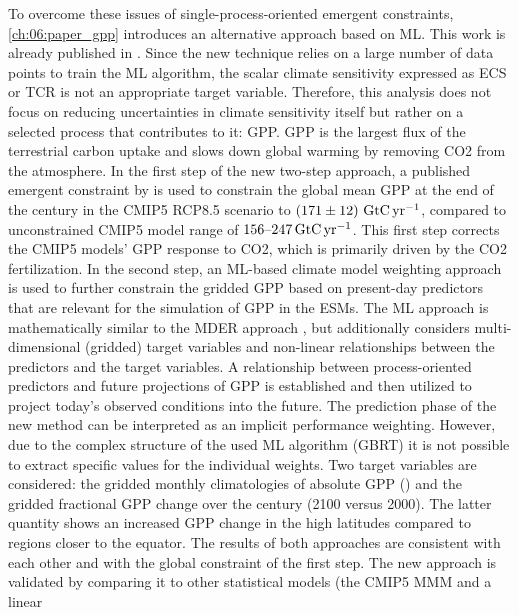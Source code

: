 To overcome these issues of single-process-oriented emergent constraints,
\cref{ch:06:paper_gpp} introduces an alternative approach based on \ac{ML}.
This work is already published in \textcite{Schlund2020}. Since the new
technique relies on a large number of data points to train the \ac{ML}
algorithm, the scalar climate sensitivity expressed as \ac{ECS} or \ac{TCR} is
not an appropriate target variable. Therefore, this analysis does not focus on
reducing uncertainties in climate sensitivity itself but rather on a selected
process that contributes to it: \ac{GPP}. \Ac{GPP} is the largest flux of the
terrestrial carbon uptake and slows down global warming by removing \ac{CO2}
from the atmosphere. In the first step of the new two-step approach, a
published emergent constraint by \textcite{Wenzel2016} is used to constrain the
global mean \ac{GPP} at the end of the  century in the \acs{CMIP}5
\acs{RCP}8.5 scenario to $\pmrangeunit{171}{12}{\GtCyr{}}$, compared to
unconstrained \acs{CMIP}5 model range of $\rangeunit{156}{247}{\GtCyr{}}$. This
first step corrects the \acs{CMIP}5 models' \ac{GPP} response to \ac{CO2},
which is primarily driven by the \ac{CO2} fertilization. In the second step, an
\acs{ML}-based climate model weighting approach is used to further constrain
the gridded \ac{GPP} based on present-day predictors that are relevant for the
simulation of \ac{GPP} in the \acp{ESM}. The \ac{ML} approach is mathematically
similar to the \ac{MDER} approach \autocite{Karpechko2013, Senftleben2020,
  Wenzel2016a}, but additionally considers multi-dimensional (gridded) target
variables and non-linear relationships between the predictors and the target
variables. A relationship between process-oriented predictors and future
projections of \ac{GPP} is established and then utilized to project today's
observed conditions into the future. The prediction phase of the new method can
be interpreted as an implicit performance weighting. However, due to the
complex structure of the used \ac{ML} algorithm (\ac{GBRT}) it is not possible
to extract specific values for the individual weights. Two target variables are
considered: the gridded monthly climatologies of absolute \ac{GPP}
() and the gridded fractional \ac{GPP} change over the
 century (2100 versus 2000). The latter quantity shows an increased
\acs{GPP} change in the high latitudes compared to regions closer to the
equator. The results of both approaches are consistent with each other and with
the global constraint of the first step. The new approach is validated by
comparing it to other statistical models (the \acs{CMIP}5 \ac{MMM} and a linear
